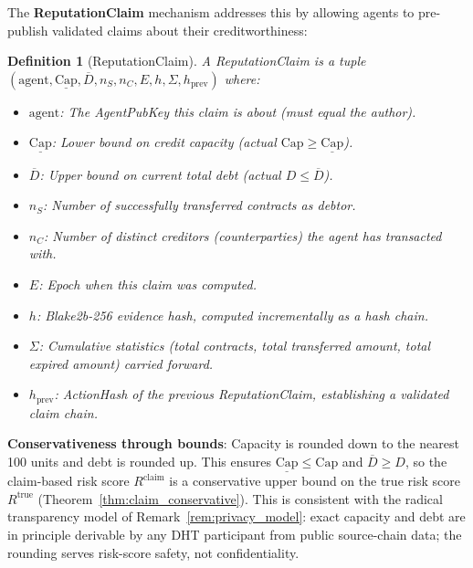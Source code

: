 \documentclass[11pt]{article}
\newtheorem{definition}[theorem]{Definition}
\begin{document}
The \textbf{ReputationClaim} mechanism addresses this by allowing agents to pre-publish validated claims about their creditworthiness:

\begin{definition}[ReputationClaim]
A ReputationClaim is a tuple $(\text{agent}, \underline{\text{Cap}}, \overline{D}, n_S, n_C, E, h, \Sigma, h_{\text{prev}})$ where:
\begin{itemize}
    \item $\text{agent}$: The AgentPubKey this claim is about (must equal the author).
    \item $\underline{\text{Cap}}$: Lower bound on credit capacity (actual $\text{Cap} \geq \underline{\text{Cap}}$).
    \item $\overline{D}$: Upper bound on current total debt (actual $D \leq \overline{D}$).
    \item $n_S$: Number of successfully transferred contracts as debtor.
    \item $n_C$: Number of distinct creditors (counterparties) the agent has transacted with.
    \item $E$: Epoch when this claim was computed.
    \item $h$: Blake2b-256 evidence hash, computed incrementally as a hash chain.
    \item $\Sigma$: Cumulative statistics (total contracts, total transferred amount, total expired amount) carried forward.
    \item $h_{\text{prev}}$: ActionHash of the previous ReputationClaim, establishing a validated claim chain.
\end{itemize}
\end{definition}

\textbf{Conservativeness through bounds}: Capacity is rounded down to the nearest 100 units and debt is rounded up. This ensures $\underline{\text{Cap}} \leq \text{Cap}$ and $\overline{D} \geq D$, so the claim-based risk score $R^{\text{claim}}$ is a conservative upper bound on the true risk score $R^{\text{true}}$ (Theorem~\ref{thm:claim_conservative}). This is consistent with the radical transparency model of Remark~\ref{rem:privacy_model}: exact capacity and debt are in principle derivable by any DHT participant from public source-chain data; the rounding serves risk-score safety, not confidentiality.
\end{document}
